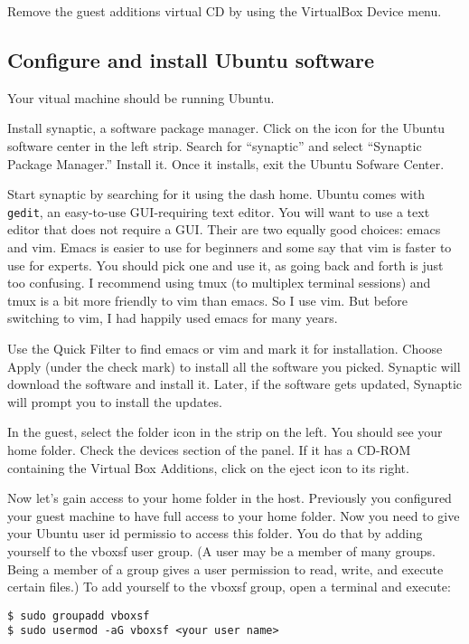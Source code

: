 \documentclass{article}
\let\code\texttt %
\begin{document}
Remove the guest additions virtual CD by using the VirtualBox Device
menu.

\subsection{Configure and install Ubuntu software}

Your vitual machine should be running Ubuntu.

Install synaptic, a software package manager. Click on the icon for the
Ubuntu software center in the left strip. Search for ``synaptic'' and
select ``Synaptic Package Manager.'' Install it. Once it installs, exit
the Ubuntu Sofware Center.

Start synaptic by searching for it using the dash home. Ubuntu comes
with \code{gedit}, an easy-to-use GUI-requiring text editor. You will want to use a
text editor that does not require a GUI. Their are two equally good
choices: emacs and vim. Emacs is easier to use for beginners and some
say that vim is faster to use for experts. You should pick one and use
it, as going back and forth is just too confusing. I recommend using
tmux (to multiplex terminal sessions) and tmux is a bit more friendly to
vim than emacs. So I use vim. But before switching to vim, I had happily
used emacs for many years.

Use the Quick Filter to find emacs or vim and mark it for installation.
Choose Apply (under the check mark) to install all the software you
picked. Synaptic will download the software and install it. Later, if
the software gets updated, Synaptic will prompt you to install the
updates.

In the guest, select the folder icon in the strip on the left. You should
see your home folder. Check the devices section of the panel. If it has
a CD-ROM containing the Virtual Box Additions, click on the eject icon
to its right.

Now let's gain access to your home folder in the host. Previously you
configured your guest machine to have full access to your home folder.
Now you need to give your Ubuntu user id permissio to access this
folder. You do that by adding yourself to the vboxsf user group. (A user
may be a member of many groups. Being a member of a group gives a user
permission to read, write, and execute certain files.) To add yourself
to the vboxsf group, open a terminal and execute:

\begin{verbatim}
$ sudo groupadd vboxsf
$ sudo usermod -aG vboxsf <your user name>
\end{verbatim}
\end{document}
